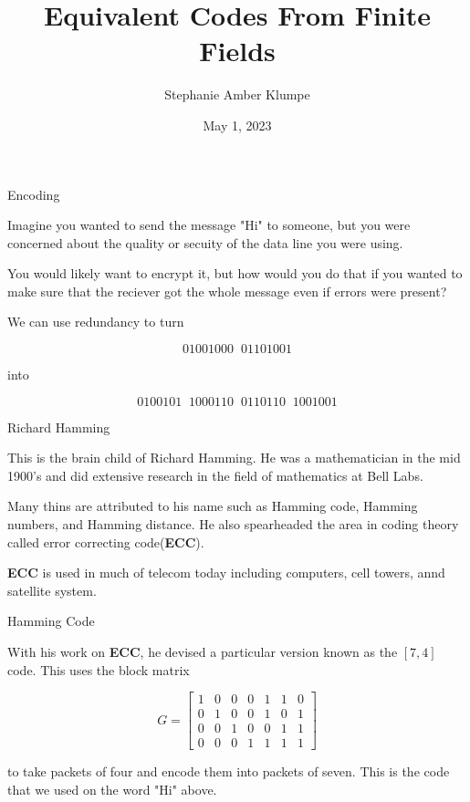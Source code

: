 \documentclass{beamer}
\title{Equivalent Codes From Finite Fields}
\author{Stephanie Amber Klumpe}
\institute{University of Colorado at Colorado Springs}
\date{May 1, 2023}
\begin{document}
\begin{frame}
    \titlepage
\end{frame}

\begin{frame}{Encoding}
    
    Imagine you wanted to send the message "Hi" to someone, but you were concerned about the quality
    or secuity of the data line you were using.

    \medskip

    \pause

    You would likely want to encrypt it, but how would you do that if you wanted to make sure that the
    reciever got the whole message even if errors were present?

    \medskip

    \pause

    We can use redundancy to turn
    
    $$01001000\;\;01101001$$
    
    into
    
    $$0100101\;\;1000110\;\;0110110\;\;1001001$$

\end{frame}

\begin{frame}{Richard Hamming}
    
    This is the brain child of Richard Hamming. He was a mathematician in the mid 1900's and did
    extensive research in the field of mathematics at Bell Labs.

    \bigskip

    Many thins are attributed to his name such as Hamming code, Hamming numbers, and Hamming distance.
    He also spearheaded the area in coding theory called error correcting code(\textbf{ECC}).

    \bigskip

    \pause

    \textbf{ECC} is used in much of telecom today including computers, cell towers, annd satellite system.

\end{frame}

\begin{frame}{Hamming Code}
    
    With his work on \textbf{ECC}, he devised a particular version known as the $[7,4]$ code. This uses
    the block matrix

    $$G=\left[\begin{array}{ccccccc}
        1 & 0 & 0 & 0 & 1 & 1 & 0 \\
        0 & 1 & 0 & 0 & 1 & 0 & 1 \\
        0 & 0 & 1 & 0 & 0 & 1 & 1 \\
        0 & 0 & 0 & 1 & 1 & 1 & 1
    \end{array}\right]$$

    to take packets of four and encode them into packets of seven. This is the code that we used on the
    word "Hi" above.

\end{frame}
\end{document}
